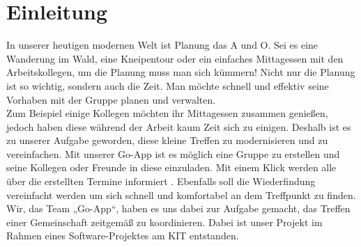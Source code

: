 \section{Einleitung}
In unserer heutigen modernen Welt ist Planung das A und O. Sei es eine Wanderung im Wald, eine Kneipentour oder ein einfaches Mittagessen mit den Arbeitskollegen, um die Planung muss man sich kümmern! 
Nicht nur die Planung ist so wichtig, sondern auch die Zeit. Man möchte schnell und effektiv seine Vorhaben mit der Gruppe planen und verwalten.\\
Zum Beispiel einige Kollegen möchten ihr Mittagessen zusammen genießen, jedoch haben diese während der Arbeit kaum Zeit sich zu einigen. Deshalb ist es zu unserer Aufgabe geworden, diese kleine Treffen zu modernisieren und zu vereinfachen. Mit unserer Go-App ist es möglich eine Gruppe zu erstellen und seine Kollegen oder Freunde in diese einzuladen. Mit einem Klick werden alle über die erstellten Termine informiert . Ebenfalls soll die Wiederfindung vereinfacht werden um sich schnell und komfortabel an dem Treffpunkt zu finden.\\
Wir, das Team „Go-App“, haben es uns dabei zur Aufgabe gemacht, das Treffen einer Gemeinschaft zeitgemäß zu koordinieren. Dabei ist unser Projekt im Rahmen eines Software-Projektes am KIT entstanden. \\


